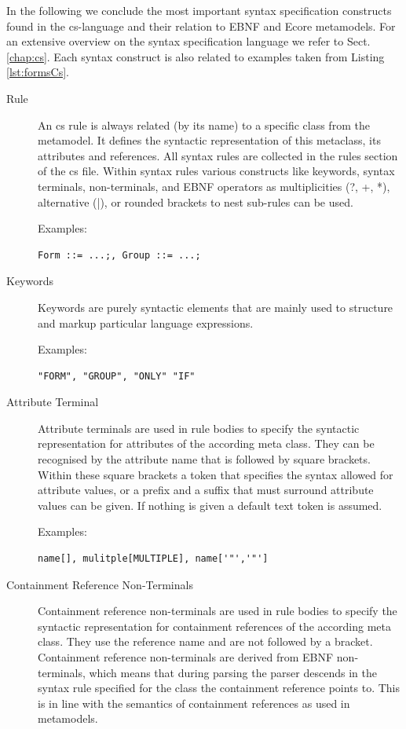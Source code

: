 	In the following we conclude the most important syntax specification
	constructs found in the cs-language and their relation to EBNF and Ecore
	metamodels. For an extensive overview on the syntax specification language we
	refer to Sect. \ref{chap:cs}. Each syntax construct is also related to examples
	taken from Listing \ref{lst:formsCs}.

	\begin{description}
       \item[Rule] An cs rule is always related (by its name) to a specific
		class from the metamodel. It defines the syntactic representation of this
		metaclass, its attributes and references. All syntax rules are collected in
		the rules section of the cs file. Within syntax rules various constructs like
		keywords, syntax terminals, non-terminals, and EBNF operators as
		multiplicities (?, +, *), alternative (|), or rounded brackets 
		to nest sub-rules can be used.
		
		Examples: \begin{verbatim}Form ::= ...;, Group ::= ...;\end{verbatim}
        
       \item[Keywords] Keywords are purely syntactic elements that are mainly
        used to structure and markup particular language expressions.
        
        Examples: \begin{verbatim}"FORM", "GROUP", "ONLY" "IF" \end{verbatim}
        
        
       \item[Attribute Terminal] Attribute terminals are used in rule bodies to
        specify the syntactic representation for attributes of the according
        meta class. They can be recognised by the attribute name that is followed
        by square brackets. Within these square brackets a token that specifies
        the syntax allowed for attribute values, or a prefix and a suffix that
        must surround attribute values can be given. If nothing is given a
        default text token is assumed.

        Examples: \begin{verbatim}name[], mulitple[MULTIPLE], name['"','"']\end{verbatim}


       \item[Containment Reference Non-Terminals] Containment reference non-terminals
       are used in rule bodies to specify the syntactic representation for
       containment references of the according meta class. They use the
       reference name and are not followed by a bracket. Containment reference non-terminals
        are derived from
       EBNF non-terminals, which means that during parsing the parser descends
       in the syntax rule specified for the class the
       containment reference points to. This is in line with the semantics of
       containment references as used in metamodels. 


\end{description}
